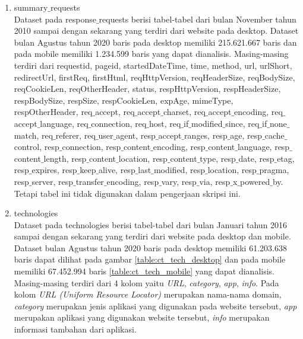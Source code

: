 \begin{enumerate}
\item summary$\_$requests\\
Dataset pada response$\_$requests berisi tabel-tabel dari bulan November tahun 2010 sampai dengan sekarang yang terdiri dari website pada desktop. Dataset bulan Agustus tahun 2020 baris pada desktop memiliki 215.621.667 baris dan pada mobile memiliki 1.234.599 baris yang dapat dianalisis. Masing-masing terdiri dari requestid, pageid, startedDateTime, time, method, url, urlShort, redirectUrl, firstReq, firstHtml, reqHttpVersion, reqHeaderSize, reqBodySize, reqCookieLen, reqOtherHeader, status, respHttpVersion, respHeaderSize, respBodySize, respSize, respCookieLen, expAge, mimeType, respOtherHeader, req$\_$accept, req$\_$accept$\_$charset, req$\_$accept$\_$encoding, req$\_$accept$\_$language, req$\_$connection, req$\_$host, req$\_$if$\_$modified$\_$since, req$\_$if$\_$none$\_$match, req$\_$referer, req$\_$user$\_$agent, resp$\_$accept$\_$ranges, resp$\_$age, resp$\_$cache$\_$control, resp$\_$connection, resp$\_$content$\_$encoding, resp$\_$content$\_$language, resp$\_$content$\_$length, resp$\_$content$\_$location, resp$\_$content$\_$type, resp$\_$date, resp$\_$etag, resp$\_$expires, resp$\_$keep$\_$alive, resp$\_$last$\_$modified, resp$\_$location, resp$\_$pragma, resp$\_$server, resp$\_$transfer$\_$encoding, resp$\_$vary, resp$\_$via, resp$\_$x$\_$powered$\_$by. Tetapi tabel ini tidak digunakan dalam pengerjaan skripsi ini.
\item technologies\\
Dataset pada technologies berisi tabel-tabel dari bulan Januari tahun 2016 sampai dengan sekarang yang terdiri dari website pada desktop dan mobile. Dataset bulan Agustus tahun 2020 baris pada desktop memiliki 61.203.638 baris  dapat dilihat pada gambar \ref{table:ct_tech_desktop} dan pada mobile memiliki 67.452.994 baris \ref{table:ct_tech_mobile} yang dapat dianalisis. Masing-masing terdiri dari 4 kolom yaitu \textit{URL}, \textit{category}, \textit{app}, \textit{info}. Pada kolom \textit{URL (Uniform Resource Locator)} merupakan nama-nama domain, \textit{category} merupakan jenis aplikasi yang digunakan pada website tersebut, \textit{app} merupakan aplikasi yang digunakan website tersebut, \textit{info} merupakan informasi tambahan dari aplikasi. 


\end{enumerate}
